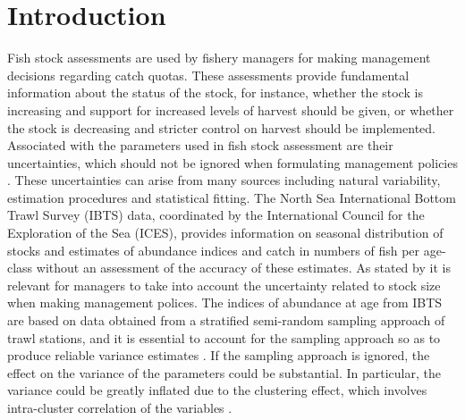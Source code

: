\documentclass[a4paper 12pt]{article}
\numberwithin{equation}{section}
\begin{document}
\section{Introduction}
Fish stock assessments are used by fishery managers for making management decisions regarding catch quotas. These assessments provide fundamental information about the status of the stock, for instance, whether the stock is increasing and support for increased levels of harvest should be given, or whether the stock is decreasing and stricter control on harvest should be implemented. Associated with the parameters used in fish stock assessment are their uncertainties, which should not be ignored when formulating management policies \citep{ludwig1981measurement, berg2014evaluation}. These uncertainties can arise from many sources including natural variability, estimation procedures and statistical fitting. The North Sea International Bottom Trawl Survey (IBTS) data, coordinated by the International Council for the Exploration of the Sea (ICES), provides information on seasonal distribution of stocks and estimates of abundance indices and catch in numbers of fish per age-class without an assessment of the accuracy of these estimates. As stated by \citet{ludwig1981measurement} it is relevant for managers to take into account the uncertainty related to stock size when making management polices. The indices of abundance at age from IBTS  are based on data obtained from a stratified semi-random sampling approach of trawl stations,  and  it is essential to account for the sampling approach so as to produce reliable variance estimates \citep{lehtonen2004practical}. If the sampling approach is ignored, the effect on the variance  of the parameters could be substantial.  In particular, the variance could be greatly inflated  due to the clustering effect, which involves intra-cluster correlation of the variables \citep{aanes2015efficient, lehtonen2004practical}. 
\end{document}
